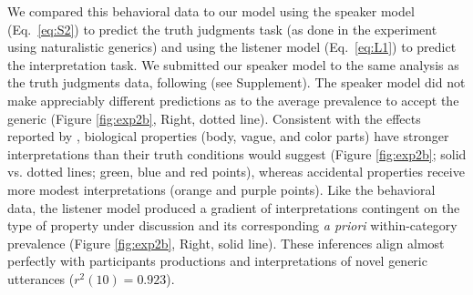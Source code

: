 \documentclass[10pt,letterpaper]{article}
\begin{document}
We compared this behavioral data to our model using the speaker model (Eq.~\ref{eq:S2}) to predict the truth judgments task (as done in the experiment using naturalistic generics) and using the listener model (Eq.~\ref{eq:L1}) to predict the interpretation task. 
We submitted our speaker model to the same analysis as the truth judgments data, following  (see Supplement). 
The speaker model did not make appreciably different predictions as to the average prevalence to accept the generic (Figure \ref{fig:exp2b}, Right, dotted line). 
Consistent with the effects reported by , biological properties (body, vague, and color parts) have stronger interpretations than their truth conditions would suggest (Figure \ref{fig:exp2b}; solid vs. dotted lines; green, blue and red points), whereas accidental properties receive more modest interpretations (orange and purple points).
Like the behavioral data, the listener model produced a gradient of interpretations contingent on the type of property under discussion and its corresponding \emph{a priori} within-category prevalence (Figure \ref{fig:exp2b}, Right, solid line). 
These inferences align almost perfectly with participants productions and interpretations of novel generic utterances ($r^2(10) = 0.923$). 

%
\end{document}
